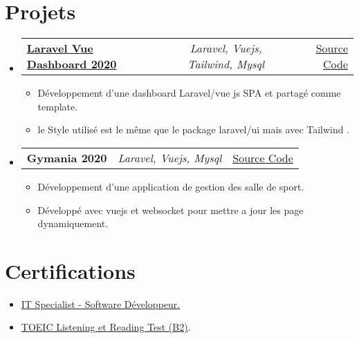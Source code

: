 \documentclass[a4paper,11pt]{article}
\makeatletter
\newcommand{\resumeItem}[1]{
  \item\small{#1}
}
\newcommand{\resumeItemListStart}{\begin{itemize}[rightmargin=0.11in]}
\newcommand{\resumeItemListEnd}{\end{itemize}}
\newcommand{\resumeTrioHeading}[3]{
  \item\small{
    \begin{tabular*}{0.96\textwidth}[t]{
      l@{\extracolsep{\fill}}c@{\extracolsep{\fill}}r
    }
      \textbf{#1} & \textit{#2} & #3
    \end{tabular*}
  }
}
\newcommand{\resumeHeadingListStart}{
  \begin{itemize}[leftmargin=0.15in, label={}]
}
\newcommand{\resumeHeadingListEnd}{\end{itemize}}
\makeatother
\begin{document}
\section{Projets}
  \resumeHeadingListStart{}
    \resumeTrioHeading{\href{https://project1.com}{Laravel Vue Dashboard \textsc{2020}}}{Laravel, Vuejs, Tailwind, Mysql}{\href{https://github.com/HijenHEK/laravel-vue-sanctum-spa}{\uline{Source Code}}}
      \resumeItemListStart{}
        \resumeItem{Développement d'une dashboard Laravel/vue js SPA et partagé comme template.}
        \resumeItem{le Style utilisé est le même que le package laravel/ui mais avec Tailwind .}
      \resumeItemListEnd{}

      \resumeTrioHeading{Gymania \textsc{2020}}{Laravel, Vuejs, Mysql}{\href{https://github.com/HijenHEK/gymania}{\uline{Source Code}}}
      \resumeItemListStart{}
        \resumeItem{Développement d'une application de gestion des salle de sport.}
        \resumeItem{Développé avec vuejs et websocket pour mettre a jour les page dynamiquement.}
      \resumeItemListEnd{}
  \resumeHeadingListEnd{}



\section{Certifications}
  \resumeItemListStart{}
    \resumeItem{\href{https://www.credly.com/badges/89c72af7-5085-4fd9-8828-b404e7b414c8/linked_in_profile}{\uline{IT Specialist - Software Développeur}.}}\\
    \resumeItem{\uline{TOEIC Listening et Reading Test (B2)}.}
  \resumeItemListEnd{}
\end{document}
